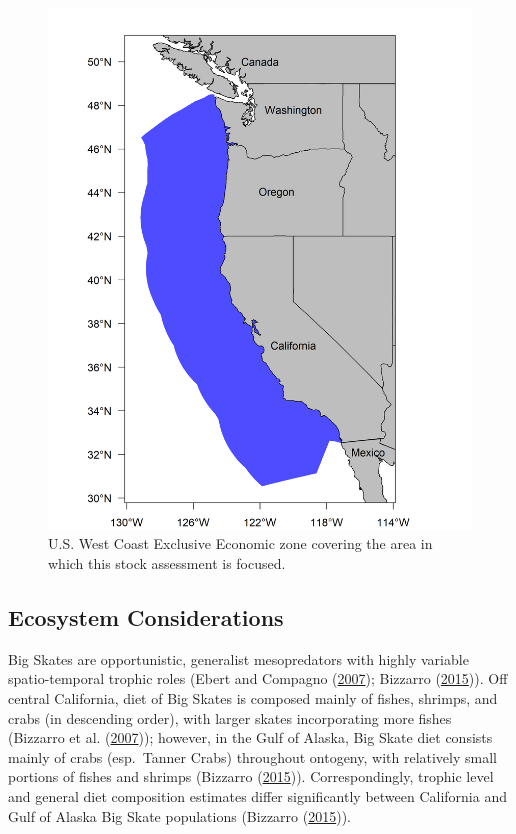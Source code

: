 \documentclass[12pt,]{article}
\begin{document}
\begin{figure}
\centering
\includegraphics{Figures/assess_region_map.png}
\caption{U.S. West Coast Exclusive Economic zone covering the area in
which this stock assessment is focused. \label{fig:assess_region_map}}
\end{figure}

\hypertarget{ecosystem-considerations-1}{%
\subsection{Ecosystem Considerations}\label{ecosystem-considerations-1}}

Big Skates are opportunistic, generalist mesopredators with highly
variable spatio-temporal trophic roles (Ebert and Compagno
(\protect\hyperlink{ref-Ebert2007}{2007}); Bizzarro
(\protect\hyperlink{ref-Bizzarro2015}{2015})). Off central California,
diet of Big Skates is composed mainly of fishes, shrimps, and crabs (in
descending order), with larger skates incorporating more fishes
(Bizzarro et al. (\protect\hyperlink{ref-Bizzarro2007}{2007})); however,
in the Gulf of Alaska, Big Skate diet consists mainly of crabs
(esp.~Tanner Crabs) throughout ontogeny, with relatively small portions
of fishes and shrimps (Bizzarro
(\protect\hyperlink{ref-Bizzarro2015}{2015})). Correspondingly, trophic
level and general diet composition estimates differ significantly
between California and Gulf of Alaska Big Skate populations (Bizzarro
(\protect\hyperlink{ref-Bizzarro2015}{2015})).
\end{document}
